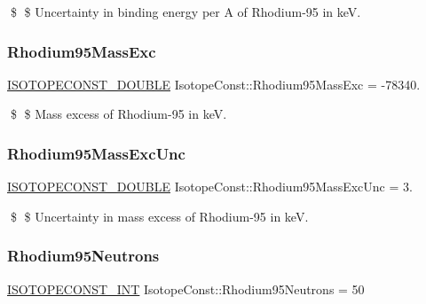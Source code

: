 \$ \$ Uncertainty in binding energy per A of Rhodium-\/95 in keV. \mbox{\label{group___isotope_const-_rhodium-_rh95_gac34e5da2025d20fa11899d554439e1e2}} 
\subsubsection{\texorpdfstring{Rhodium95\+Mass\+Exc}{Rhodium95MassExc}}
{\footnotesize\ttfamily \mbox{\hyperlink{group___isotope_const-_macros_ga8f45a7272ce02c0b4c65c44636ed719a}{I\+S\+O\+T\+O\+P\+E\+C\+O\+N\+S\+T\+\_\+\+D\+O\+U\+B\+LE}} Isotope\+Const\+::\+Rhodium95\+Mass\+Exc = -\/78340.}

\$ \$ Mass excess of Rhodium-\/95 in keV. \mbox{\label{group___isotope_const-_rhodium-_rh95_gacd398e2e275970ae4f098654880779c0}} 
\subsubsection{\texorpdfstring{Rhodium95\+Mass\+Exc\+Unc}{Rhodium95MassExcUnc}}
{\footnotesize\ttfamily \mbox{\hyperlink{group___isotope_const-_macros_ga8f45a7272ce02c0b4c65c44636ed719a}{I\+S\+O\+T\+O\+P\+E\+C\+O\+N\+S\+T\+\_\+\+D\+O\+U\+B\+LE}} Isotope\+Const\+::\+Rhodium95\+Mass\+Exc\+Unc = 3.}

\$ \$ Uncertainty in mass excess of Rhodium-\/95 in keV. \mbox{\label{group___isotope_const-_rhodium-_rh95_ga90d891a6b99ebd20e576e82ec2392883}} 
\subsubsection{\texorpdfstring{Rhodium95\+Neutrons}{Rhodium95Neutrons}}
{\footnotesize\ttfamily \mbox{\hyperlink{group___isotope_const-_macros_ga5f18360b3e99483a35c32d789e62621c}{I\+S\+O\+T\+O\+P\+E\+C\+O\+N\+S\+T\+\_\+\+I\+NT}} Isotope\+Const\+::\+Rhodium95\+Neutrons = 50}

